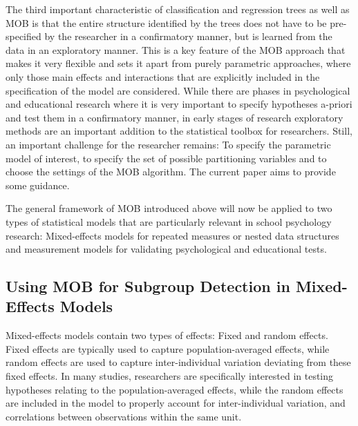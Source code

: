 \documentclass[doc,floatsintext,natbib]{apa7}
\begin{document}
The third important characteristic of classification and regression trees as well as MOB is that the entire structure identified by the trees does not have to be pre-specified by the researcher in a confirmatory manner, but is learned from the data in an exploratory manner. This is a key feature of the MOB approach that makes it very flexible and sets it apart from purely parametric approaches, where only those main effects and interactions that are explicitly included in the specification of the model are considered. While there are phases in psychological and educational research where it is very important to specify hypotheses a-priori and test them in a confirmatory manner, in early stages of research exploratory methods are an important addition to the statistical toolbox for researchers. Still, an important challenge for the researcher remains: To specify the parametric model of interest, to specify the set of possible partitioning variables and to choose the settings of the MOB algorithm. The current paper aims to provide some guidance. 

The general framework of MOB introduced above will now be applied to two types of statistical models that are particularly relevant in school psychology research: Mixed-effects models for repeated measures or nested data structures and measurement models for validating psychological and educational tests. 

\subsection{Using MOB for Subgroup Detection in Mixed-Effects Models}

Mixed-effects models contain two types of effects: Fixed and random effects. Fixed effects are typically used to capture population-averaged effects, while random effects are used to capture inter-individual variation deviating from these fixed effects. In many studies, researchers are specifically interested in testing hypotheses relating to the population-averaged effects, while the random effects are included in the model to properly account for inter-individual variation, and correlations between observations within the same unit.
\end{document}
